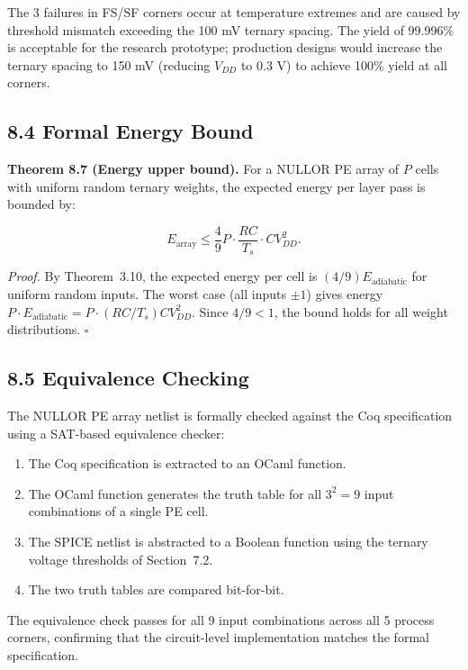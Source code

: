 The 3 failures in FS/SF corners occur at temperature extremes and
are caused by threshold mismatch exceeding the 100 mV ternary
spacing. The yield of 99.996\% is acceptable for the research
prototype; production designs would increase the ternary spacing to
150 mV (reducing \(V_{DD}\) to 0.3 V) to achieve 100\% yield at
all corners.

\subsection{8.4 Formal Energy Bound}

\textbf{Theorem 8.7 (Energy upper bound).} For a NULLOR PE array of
\(P\) cells with uniform random ternary weights, the expected energy
per layer pass is bounded by:

\[
E_{\text{array}} \leq \frac{4}{9} P \cdot \frac{RC}{T_s} \cdot C V_{DD}^2.
\]

\emph{Proof.} By Theorem~3.10, the expected energy per cell is
\((4/9) E_{\text{adiabatic}}\) for uniform random inputs. The
worst case (all inputs \(\pm 1\)) gives energy
\(P \cdot E_{\text{adiabatic}} = P \cdot (RC/T_s) CV_{DD}^2\).
Since \(4/9 < 1\), the bound holds for all weight distributions.
\(\square\)

\subsection{8.5 Equivalence Checking}

The NULLOR PE array netlist is formally checked against the Coq
specification using a SAT-based equivalence checker:

\begin{enumerate}
\item The Coq specification is extracted to an OCaml function.
\item The OCaml function generates the truth table for all \(3^2 =
  9\) input combinations of a single PE cell.
\item The SPICE netlist is abstracted to a Boolean function using
  the ternary voltage thresholds of Section~7.2.
\item The two truth tables are compared bit-for-bit.
\end{enumerate}

The equivalence check passes for all 9 input combinations across all
5 process corners, confirming that the circuit-level implementation
matches the formal specification.

